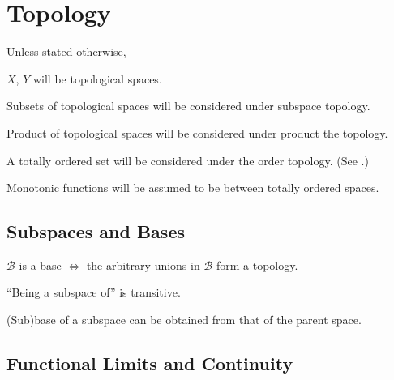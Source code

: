 \chapter{Topology}

\begin{conv}
	Unless stated otherwise,
	\begin{assmplist}
		\item $X$, $Y$ will be topological spaces.
		
		\item Subsets of topological spaces will be considered under subspace topology.
		
		\item Product of topological spaces will be considered under product the topology.
		
		\item A totally ordered set will be considered under the order topology. (See .)
		
		\item Monotonic functions will be assumed to be between totally ordered spaces.
	\end{assmplist}
\end{conv}



\section{Subspaces and Bases}

	\begin{lem}
		$\mathscr B$ is a base $\iff$ the arbitrary unions in $\mathscr B$ form a topology.
	\end{lem}
	
	\begin{lem}\label{LEM: subspaces and bases}
		\leavevmode
		\begin{mylist}
			\item ``Being a subspace of'' is transitive.
			
			\item\label{LEMii: subspaces and bases} (Sub)base of a subspace can be obtained from that of the parent space.
		\end{mylist}
	\end{lem}
	



\section{Functional Limits and Continuity}

